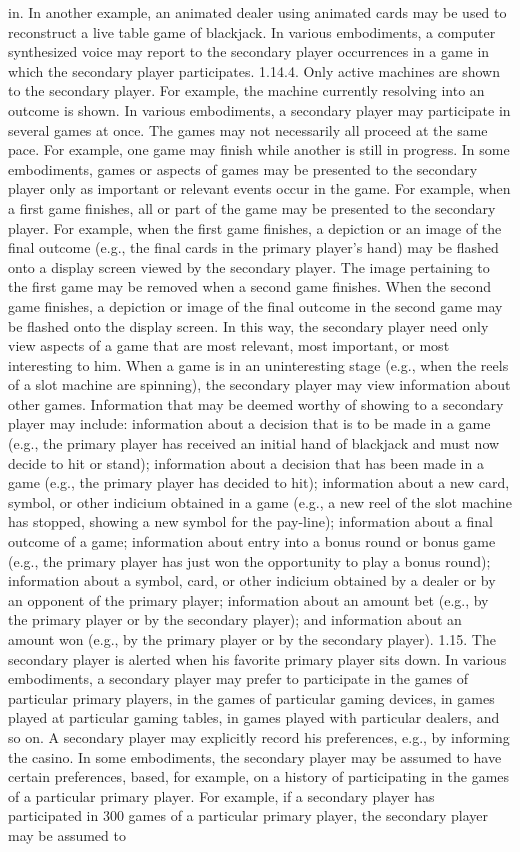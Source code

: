 \documentclass[11pt,a4paper]{article}
\begin{document}
in. In another example, an animated dealer using animated cards may be used to reconstruct a live table game of blackjack. In various embodiments, a computer synthesized voice may report to the secondary player occurrences in a game in which the secondary player participates. 1.14.4. Only active machines are shown to the secondary player. For example, the machine currently resolving into an outcome is shown. In various embodiments, a secondary player may participate in several games at once. The games may not necessarily all proceed at the same pace. For example, one game may finish while another is still in progress. In some embodiments, games or aspects of games may be presented to the secondary player only as important or relevant events occur in the game. For example, when a first game finishes, all or part of the game may be presented to the secondary player. For example, when the first game finishes, a depiction or an image of the final outcome (e.g., the final cards in the primary player's hand) may be flashed onto a display screen viewed by the secondary player. The image pertaining to the first game may be removed when a second game finishes. When the second game finishes, a depiction or image of the final outcome in the second game may be flashed onto the display screen. In this way, the secondary player need only view aspects of a game that are most relevant, most important, or most interesting to him. When a game is in an uninteresting stage (e.g., when the reels of a slot machine are spinning), the secondary player may view information about other games. Information that may be deemed worthy of showing to a secondary player may include: information about a decision that is to be made in a game (e.g., the primary player has received an initial hand of blackjack and must now decide to hit or stand); information about a decision that has been made in a game (e.g., the primary player has decided to hit); information about a new card, symbol, or other indicium obtained in a game (e.g., a new reel of the slot machine has stopped, showing a new symbol for the pay-line); information about a final outcome of a game; information about entry into a bonus round or bonus game (e.g., the primary player has just won the opportunity to play a bonus round); information about a symbol, card, or other indicium obtained by a dealer or by an opponent of the primary player; information about an amount bet (e.g., by the primary player or by the secondary player); and information about an amount won (e.g., by the primary player or by the secondary player). 1.15. The secondary player is alerted when his favorite primary player sits down. In various embodiments, a secondary player may prefer to participate in the games of particular primary players, in the games of particular gaming devices, in games played at particular gaming tables, in games played with particular dealers, and so on. A secondary player may explicitly record his preferences, e.g., by informing the casino. In some embodiments, the secondary player may be assumed to have certain preferences, based, for example, on a history of participating in the games of a particular primary player. For example, if a secondary player has participated in 300 games of a particular primary player, the secondary player may be assumed to 
\end{document}
